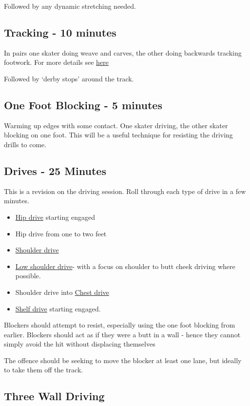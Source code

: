 \documentclass{journal}
\begin{document}
Followed by any dynamic stretching needed.

\subsection*{Tracking - 10 minutes}
In pairs one skater doing weave and carves, the other doing backwards tracking footwork. For more details see \hyperref[drill:one_on_one/tracking]{here}


Followed by `derby stops' around the track.

\subsection*{One Foot Blocking - 5 minutes}

Warming up edges with some contact. 
One skater driving, the other skater blocking on one foot. 
This will be a useful technique for resisting the driving drills to come.


\subsection*{Drives - 25 Minutes}
This is a revision on the driving session.
Roll through each type of drive in a few minutes.

\begin{itemize}
\item \hyperref[drill:drives/hip]{Hip drive} starting engaged
\item Hip drive from one to two feet 
\item \hyperref[drill:drives/shoulder]{Shoulder drive} 
\item \hyperref[drill:drives/low_shoulder]{Low shoulder drive}- with a focus on shoulder to butt cheek driving where possible. 
\item Shoulder drive into \hyperref[drill:drives/chest]{Chest drive}
\item \hyperref[drill:drives/shelf]{Shelf drive} starting engaged.
\end{itemize}

Blockers should attempt to resist, especially using the one foot blocking from earlier.
Blockers should act as if they were a butt in a wall - hence they cannot simply avoid the hit without displacing themselves 

The offence should be seeking to move the blocker at least one lane, but ideally to take them off the track. 

\subsection*{Three Wall Driving}
\end{document}
